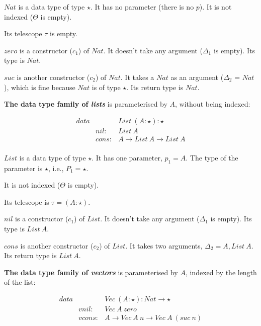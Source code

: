 \documentclass[acmsmall]{acmart}
\begin{document}
$Nat$ is a data type of type $\star$. It has no parameter (there is no $p$). It is not indexed ($\Theta$ is empty).

Its telescope $\tau$ is empty.

$zero$ is a constructor ($c_1$) of $Nat$. It doesn't take any argument ($\Delta_1$ is empty). Its type is $Nat$. 

$suc$ is another constructor ($c_2$) of $Nat$. It takes a $Nat$ as an argument ($\Delta_2$ = $Nat$), which is fine because $Nat$ is of type $\star$. Its return type is $Nat$.

\textbf{The data type family of \emph{lists}} is parameterised by $A$, without being indexed:

\begin{equation*}
  \begin{aligned}
    data &       & List \: (A:\star) : \star     \\
         & nil:  & List \: A                     \\
         & cons: & A \to List \: A \to List \: A \\
  \end{aligned}
\end{equation*}

$List$ is a data type of type $\star$. It has one parameter, $p_1 = A$. The type of the parameter is $\star$, i.e., $P_1 = \star$. 

It is not indexed ($\Theta$ is empty).

Its telescope is $\tau = (A:\star)$. 

$nil$ is a constructor ($c_1$) of $List$. It doesn't take any argument ($\Delta_1$ is empty). Its type is $List \: A$.

$cons$ is another constructor ($c_2$) of $List$. It takes two arguments, $\Delta_2 = A, List \: A$. Its return type is $List \: A$.

\textbf{The data type family of \emph{vectors}} is parameterised by $A$, indexed by the length of the list:

\begin{equation*}
  \begin{aligned}
    data &        & Vec \: (A:\star) : Nat \to \star               \\
         & vnil:  & Vec \: A \: zero                               \\
         & vcons: & A \to Vec \: A \: n \to Vec \: A \: (suc \: n) \\
  \end{aligned}
\end{equation*}
\end{document}
